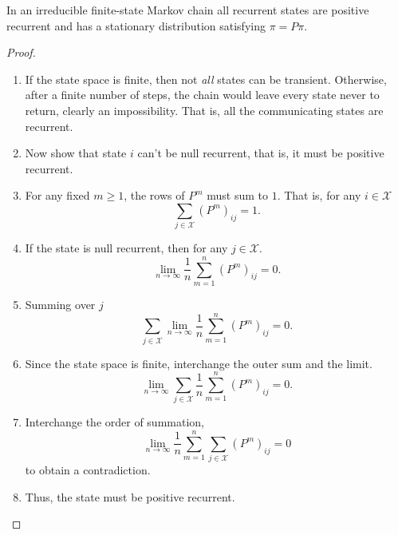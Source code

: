 \documentclass[12pt]{article}
\begin{document}
\begin{proposition}
    In an irreducible finite-state Markov chain all recurrent states are
    positive recurrent and has a stationary distribution satisfying \(
    \pi = P \pi \).
\end{proposition}

\begin{proof}
    \begin{enumerate}
        \item
            If the state space is finite, then not \emph{all} states can
            be transient.  Otherwise, after a finite number of steps,
            the chain would leave every state never to return, clearly
            an impossibility.  That is, all the communicating states are
            recurrent.
        \item
            Now show that state \( i \) can't be null recurrent, that
            is, it must be positive recurrent.
        \item
            For any fixed \( m \ge 1 \), the rows of \( P^m \) must sum
            to \( 1 \).  That is, for any \( i \in \mathcal{X} \)
            \[
                \sum\limits_{j \in \mathcal{X}} (P^m)_{ij} = 1.
            \]
        \item
            If the state is null recurrent, then for any \( j \in
            \mathcal{X} \).
            \[
                \lim_{n \to \infty} \frac{1}{n} \sum\limits_{m=1}^n (P^m)_
                {ij} = 0.
            \]
        \item
            Summing over \( j \)
            \[
                \sum\limits_{j \in \mathcal{X}} \lim_{n \to \infty}
                \frac{1}{n} \sum\limits_{m=1}^{n} (P^m)_{ij} = 0.
            \]
        \item
            Since the state space is finite, interchange the outer sum
            and the limit.
            \[
                \lim_{n \to \infty} \sum\limits_{j \in \mathcal{X}}
                \frac{1}{n} \sum\limits_{m=1}^{n} (P^m)_{ij} = 0.
            \]
        \item
            Interchange the order of summation,
            \[
                \lim_{n \to \infty} \frac{1}{n} \sum\limits_{m=1}^{n}
                \sum\limits_{j \in \mathcal{X}} (P^m)_{ij} = 0
            \] to obtain a contradiction.
        \item
            Thus, the state must be positive recurrent.
    \end{enumerate}
\end{proof}
\end{document}
